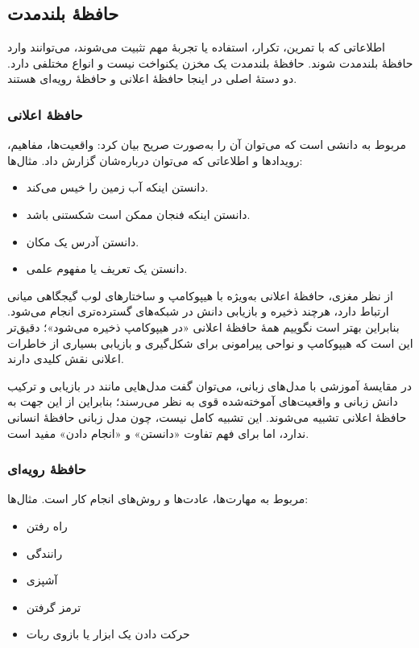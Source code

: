 \subsection{حافظهٔ بلندمدت}
اطلاعاتی که با تمرین، تکرار، استفاده یا تجربهٔ مهم تثبیت می‌شوند، می‌توانند وارد حافظهٔ بلندمدت شوند. حافظهٔ بلندمدت یک مخزن یکنواخت نیست و انواع مختلفی دارد. دو دستهٔ اصلی در اینجا حافظهٔ اعلانی و حافظهٔ رویه‌ای هستند.

\subsubsection{حافظهٔ اعلانی}
 مربوط به دانشی است که می‌توان آن را به‌صورت صریح بیان کرد: واقعیت‌ها، مفاهیم، رویدادها و اطلاعاتی که می‌توان درباره‌شان گزارش داد. مثال‌ها:
\begin{itemize}
  \item دانستن اینکه آب زمین را خیس می‌کند.
  \item دانستن اینکه فنجان ممکن است شکستنی باشد.
  \item دانستن آدرس یک مکان.
  \item دانستن یک تعریف یا مفهوم علمی.
\end{itemize}

از نظر مغزی، حافظهٔ اعلانی به‌ویژه با هیپوکامپ و ساختارهای لوب گیجگاهی میانی ارتباط دارد، هرچند ذخیره و بازیابی دانش در شبکه‌های گسترده‌تری انجام می‌شود. بنابراین بهتر است نگوییم همهٔ حافظهٔ اعلانی «در هیپوکامپ ذخیره می‌شود»؛ دقیق‌تر این است که هیپوکامپ و نواحی پیرامونی برای شکل‌گیری و بازیابی بسیاری از خاطرات اعلانی نقش کلیدی دارند.

در مقایسهٔ آموزشی با مدل‌های زبانی، می‌توان گفت مدل‌هایی مانند  در بازیابی و ترکیب دانش زبانی و واقعیت‌های آموخته‌شده قوی به نظر می‌رسند؛ بنابراین از این جهت به حافظهٔ اعلانی تشبیه می‌شوند. این تشبیه کامل نیست، چون مدل زبانی حافظهٔ انسانی ندارد، اما برای فهم تفاوت «دانستن» و «انجام دادن» مفید است.


\subsubsection{حافظهٔ رویه‌ای}
 مربوط به مهارت‌ها، عادت‌ها و روش‌های انجام کار است. مثال‌ها:
\begin{itemize}
  \item راه رفتن
  \item رانندگی
  \item آشپزی
  \item ترمز گرفتن
  \item حرکت دادن یک ابزار یا بازوی ربات
\end{itemize}

